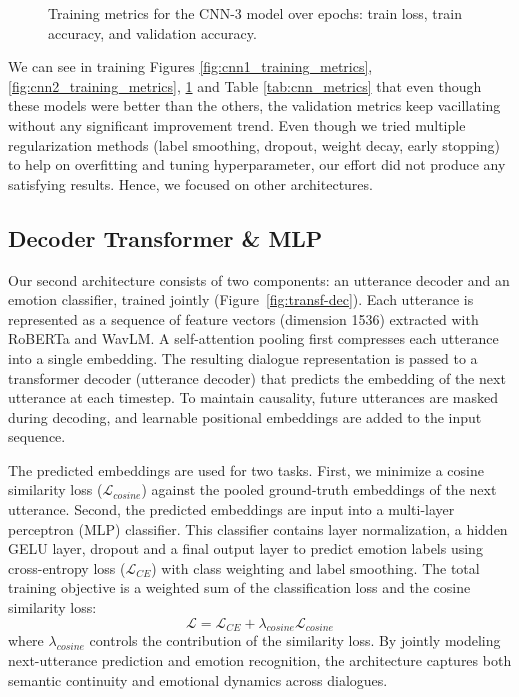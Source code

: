 \documentclass{article}
\begin{document}
\begin{figure}[t]
    \caption{Training metrics for the CNN-3 model over epochs: train loss, train accuracy, and validation accuracy.}
    \label{fig:cnn3_training_metrics}
\end{figure}


We can see in training Figures \ref{fig:cnn1_training_metrics}, \ref{fig:cnn2_training_metrics}, \ref{fig:cnn3_training_metrics} and Table \ref{tab:cnn_metrics} that even though these models were better than the others, the validation metrics keep vacillating without any significant improvement trend.
Even though we tried multiple regularization methods (label smoothing, dropout, weight decay, early stopping) to help on overfitting and tuning hyperparameter, our effort did not produce any satisfying results. Hence, we focused on other architectures.

\subsection{Decoder Transformer \& MLP}
Our second architecture consists of two components: an utterance decoder and an emotion classifier, trained jointly (Figure~\ref{fig:transf-dec}). Each utterance is represented as a sequence of feature vectors (dimension 1536) extracted with RoBERTa and WavLM. A self-attention pooling first compresses each utterance into a single embedding. The resulting dialogue representation is passed to a transformer decoder (utterance decoder) that predicts the embedding of the next utterance at each timestep. To maintain causality, future utterances are masked during decoding, and learnable positional embeddings are added to the input sequence.

The predicted embeddings are used for two tasks. First, we minimize a cosine similarity loss ($\mathcal{L}_{cosine}$) against the pooled ground-truth embeddings of the next utterance. Second, the predicted embeddings are input into a multi-layer perceptron (MLP) classifier. This classifier contains layer normalization, a hidden GELU layer, dropout and a final output layer to predict emotion labels using cross-entropy loss ($\mathcal{L}_{CE}$) with class weighting and label smoothing. The total training objective is a weighted sum of the classification loss and the cosine similarity loss:
\[
\mathcal{L}=\mathcal{L}_{CE}+ \lambda_{cosine} \mathcal{L}_{cosine}
\]
where $\lambda_{cosine}$ controls the contribution of the similarity loss. By jointly modeling next-utterance prediction and emotion recognition, the architecture captures both semantic continuity and emotional dynamics across dialogues. 
\end{document}
